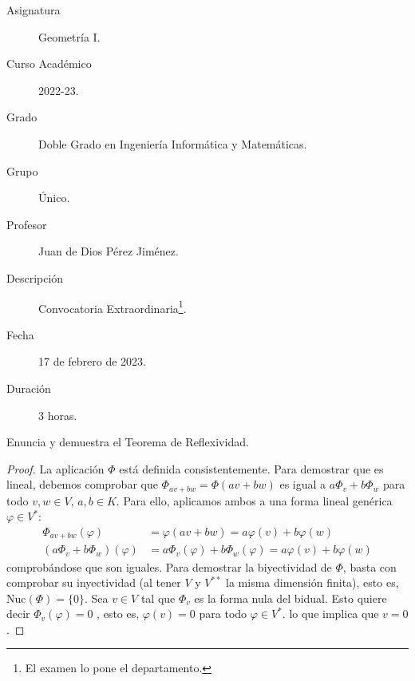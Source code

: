 \documentclass[12pt]{article}
\begin{document}
\newcommand{\F}{{\mathcal{F}}} %
\newcommand{\R}{{\mathbb{R}}}  %
\newcommand{\Q}{{\mathbb{Q}}}  %
\newcommand{\Z}{{\mathbb{Z}}}  %
\newcommand{\N}{{\mathbb{N}}}  %
\newcommand{\C}{{\mathbb{C}}}  %
\newcommand{\U}{{\mathcal{U}}} %



\begin{description}
	\item[Asignatura] Geometría I.
	\item[Curso Académico] 2022-23.
	\item[Grado] Doble Grado en Ingeniería Informática y Matemáticas.
	\item[Grupo] Único.
	\item[Profesor] Juan de Dios Pérez Jiménez.
	\item[Descripción] Convocatoria Extraordinaria\footnote{El examen lo pone el departamento.}.
	\item[Fecha] 17 de febrero de 2023.
	\item[Duración] 3 horas.

\end{description}
\newpage

\begin{ejercicio}[2,5 puntos]
	Enuncia y demuestra el Teorema de Reflexividad.
\end{ejercicio}
\begin{proof}
	La aplicación $\Phi$ está definida consistentemente. Para demostrar que es lineal, debemos comprobar que $\Phi_{av+bw} = \Phi(a v + b w)$ es igual a $a\Phi_v + b\Phi_w$ para todo $v, w \in V$, $a, b \in K$. Para ello, aplicamos ambos a una forma lineal genérica $\varphi \in V^*$:
	\begin{align*}
		\Phi_{av+bw}(\varphi)          & = \varphi(a v + b w) = a \varphi(v) + b \varphi(w)                \\
		(a\Phi_v + b \Phi_w )(\varphi) & = a\Phi_v(\varphi) + b\Phi_w(\varphi) = a\varphi(v) + b\varphi(w)
	\end{align*}
	comprobándose que son iguales. Para demostrar la biyectividad de $\Phi$, basta con comprobar su inyectividad (al tener $V$ y $V^{**}$ la misma dimensión finita),
	esto es, Nuc$(\Phi) = \{0\}$. Sea $v \in V $ tal que $\Phi_v$ es la forma nula del bidual. Esto quiere decir $\Phi_v(\varphi) = 0$
	, esto es, $\varphi(v) = 0$ para todo $\varphi \in V^*$. lo que implica que $v = 0$.
\end{proof}
\end{document}
